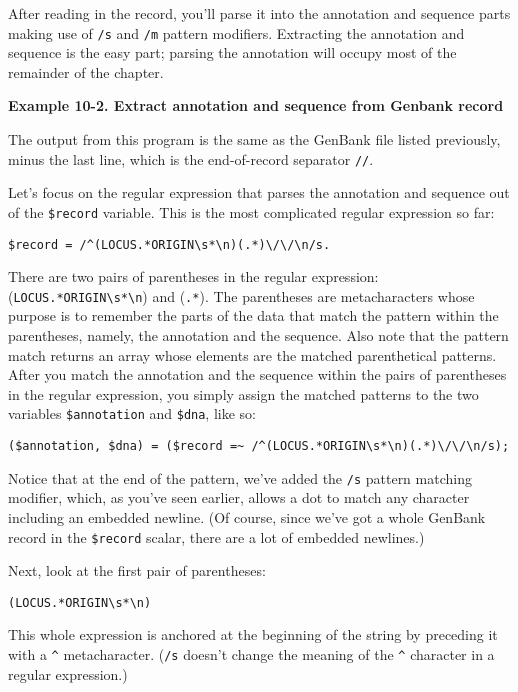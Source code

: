 After reading in the record, you'll parse it into the annotation and sequence parts making use of \verb|/s| and \verb|/m| pattern modifiers. Extracting the annotation and sequence is the easy part; parsing the annotation will occupy most of the remainder of the chapter.

\textbf{Example 10-2. Extract annotation and sequence from Genbank record}


The output from this program is the same as the GenBank file listed previously, minus the last line, which is the end-of-record separator \verb|//|.

Let's focus on the regular expression that parses the annotation and sequence out of the \verb|$record| variable. This is the most complicated regular expression so far: 

\begin{lstlisting}
$record = /^(LOCUS.*ORIGIN\s*\n)(.*)\/\/\n/s.
\end{lstlisting}

There are two pairs of parentheses in the regular expression: (\verb|LOCUS.*ORIGIN\s*\n|) and (\verb|.*|). The parentheses are metacharacters whose purpose is to remember the parts of the data that match the pattern within the parentheses, namely, the annotation and the sequence. Also note that the pattern match returns an array whose elements are the matched parenthetical patterns. After you match the annotation and the sequence within the pairs of parentheses in the regular expression, you simply assign the matched patterns to the two variables \verb|$annotation| and \verb|$dna|, like so: 

\begin{lstlisting}
($annotation, $dna) = ($record =~ /^(LOCUS.*ORIGIN\s*\n)(.*)\/\/\n/s);
\end{lstlisting}

Notice that at the end of the pattern, we've added the \verb|/s| pattern matching modifier, which, as you've seen earlier, allows a dot to match any character including an embedded newline. (Of course, since we've got a whole GenBank record in the \verb|$record| scalar, there are a lot of embedded newlines.)

Next, look at the first pair of parentheses:

\begin{lstlisting}
(LOCUS.*ORIGIN\s*\n)
\end{lstlisting}

This whole expression is anchored at the beginning of the string by preceding it with a \verb|^| metacharacter. (\verb|/s| doesn't change the meaning of the \verb|^| character in a regular expression.)

